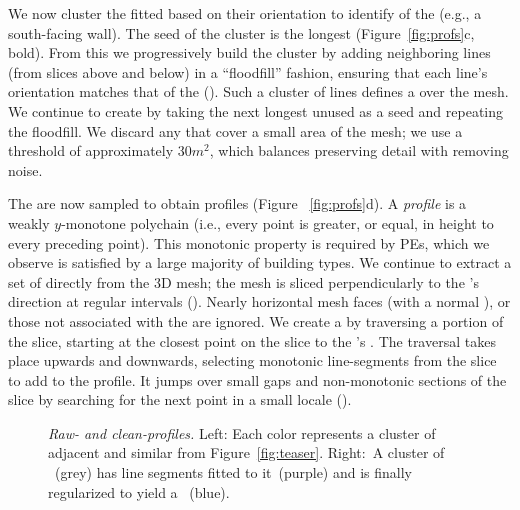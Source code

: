 We now cluster the fitted \horizontallines based on their orientation to identify \prominentfaces of the \block (e.g., a south-facing wall). The seed of the cluster is the longest \horizontalline (Figure~\ref{fig:profs}c, bold). From this \seedline we progressively build the cluster by adding neighboring lines (from slices above and below) in a ``floodfill'' fashion, ensuring that each line's orientation matches that of the \seedline ().
Such a cluster of lines defines a \emph{\prominentface} over the mesh. We continue to create \prominentfaces by taking the next longest unused \horizontalline as a seed and repeating the floodfill.
We discard any \prominentfaces that cover a small area of the mesh; we use a threshold of approximately $30m^2$, which balances preserving detail with removing noise.

The \prominentfaces are now sampled to obtain profiles (Figure ~\ref{fig:profs}d). A \emph{profile} is a weakly $y$-monotone polychain (i.e., every point is greater, or equal, in height to every preceding point). This monotonic property is required by PEs, which we observe is satisfied by a large majority of building types. 
% 
%
We continue to extract a set of \rawprofiles directly from the 3D mesh; the mesh is sliced perpendicularly to the \seedline's direction at regular intervals (\neu{20cm}). Nearly horizontal mesh faces (with a normal ), or those not associated with the \prominentface are ignored.  We create a \rawprofile by traversing a portion of the slice, starting at the closest point on the slice to the \prominentface's \seedline. The traversal takes place upwards and downwards, selecting monotonic line-segments from the slice to add to the profile. It jumps over small gaps and non-monotonic sections of the slice by searching for the next point in a small locale ().



\begin{figure}[b]
    \centering
  \def\svgwidth{1\columnwidth}  
    
    \caption{\textit{Raw- and clean-profiles.} Left: Each color represents a cluster of adjacent and similar \rawprofiles from Figure~\ref{fig:teaser}. Right:~A cluster of \rawprofiles~(grey) has line segments fitted to it~(purple) and is finally regularized to yield a \cleanprofile~(blue).}
    \label{fig:profile_cleanup}
  \vnudge
\end{figure}


